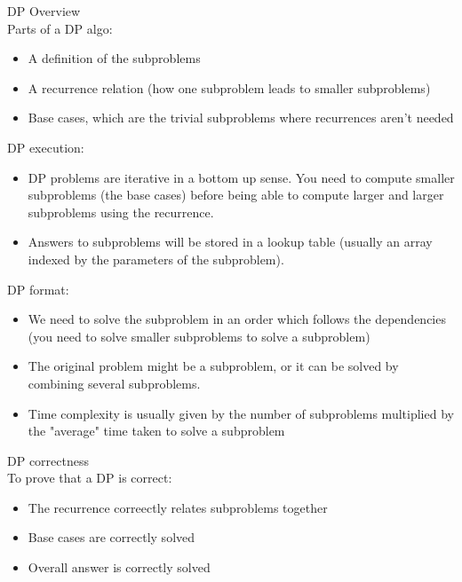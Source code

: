 \documentclass[journal, letterpaper]{IEEEtran}
\begin{document}
\begin{aside}{DP Overview}\\
    Parts of a DP algo:
    \begin{itemize}
        \item A definition of the subproblems
        \item A recurrence relation (how one subproblem leads to smaller
            subproblems)
        \item Base cases, which are the trivial subproblems where recurrences
            aren't needed
    \end{itemize}

    DP execution:
    \begin{itemize}
        \item DP problems are iterative in a bottom up sense. You need to compute smaller
            subproblems (the base cases) before being able to compute larger and larger
            subproblems using the recurrence.
        \item Answers to subproblems will be stored in a lookup table (usually an array
            indexed by the parameters of the subproblem).
    \end{itemize}

    DP format: 
    \begin{itemize}
        \item We need to solve the subproblem in an order which follows the dependencies
            (you need to solve smaller subproblems to solve a subproblem)
        \item The original problem might be a subproblem, or it can be solved by combining
            several subproblems. 
        \item Time complexity is usually given by the number of subproblems multiplied by
            the "average" time taken to solve a subproblem
    \end{itemize}
\end{aside}

\begin{theory}{DP correctness}\\
    To prove that a DP is correct:
    
    \begin{itemize}
        \item The recurrence correectly relates subproblems together
        \item Base cases are correctly solved
        \item Overall answer is correctly solved
    \end{itemize}
\end{theory}
\end{document}

